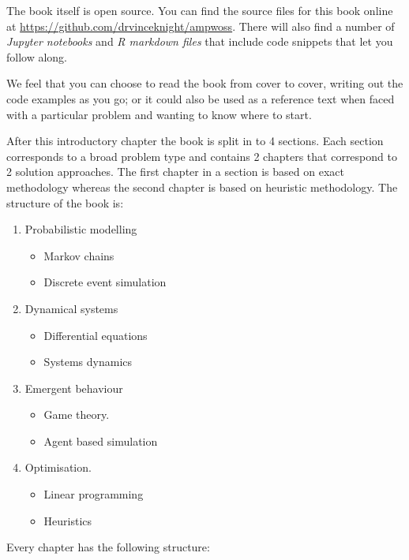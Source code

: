 The book itself is open source. You can find the source files for this
book online at \url{https://github.com/drvinceknight/ampwoss}. There will
also find a number of \emph{Jupyter notebooks} and \emph{R markdown
files} that include code snippets that let you follow along.

We feel that you can choose to read the book from cover to cover,
writing out the code examples as you go; or it could also be used as a
reference text when faced with a particular problem and wanting to know
where to start.

After this introductory chapter the book is split in to 4 sections.
Each section corresponds to a broad problem type and contains 2 chapters that
correspond to 2 solution approaches. The first chapter in a section is based on
exact methodology whereas the second chapter is based on heuristic
methodology.
The structure of the book is:

\begin{enumerate}
    \item Probabilistic modelling
        \begin{itemize}
                \item Markov chains
                \item Discrete event simulation
        \end{itemize}
    \item Dynamical systems
        \begin{itemize}
                \item Differential equations
                \item Systems dynamics
        \end{itemize}
    \item Emergent behaviour
        \begin{itemize}
                \item Game theory.
                \item Agent based simulation
        \end{itemize}
    \item Optimisation.
        \begin{itemize}
                \item Linear programming
                \item Heuristics
        \end{itemize}
\end{enumerate}

Every chapter has the following structure:

